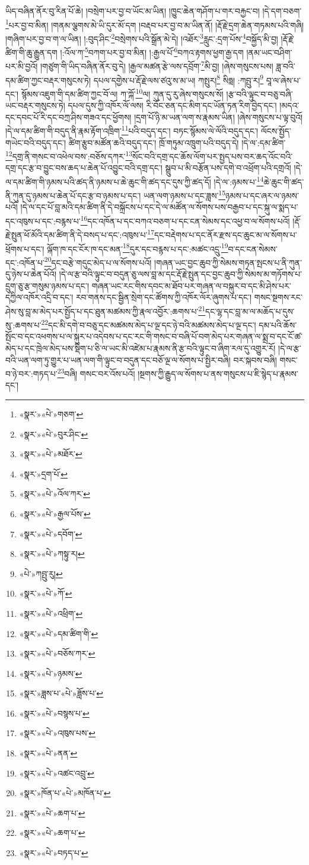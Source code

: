 ཡིད་བཞིན་ནོར་བུ་རིན་པོ་ཆེ། །བསྲེག་པར་བྱ་བ་ཡོང་མ་ཡིན། །ཁྱུང་ཆེན་གཤོག་པ་གར་བརྐྱང་བ། །དེ་དག་བཅག་\footnote{«སྣར་»«པེ་»གཅག་}པར་བྱ་བ་མིན། །གནམ་ལྕགས་མེ་ཡི་དུར་མོ་དག །བརྡབ་པར་བྱ་བ་མ་ཡིན་ནོ། །རྡོ་རྗེ་དྲག་ཆེན་གཏམས་པའི་གཞི། །གཞིག་པར་བྱ་བ་ག་ལ་ཡིན། །:བུད་ཤིང་\footnote{«སྣར་»«པེ་»བུར་ཤིང་}བསྲེགས་པའི་སྒྲོན་མེ་དེ། །འཐོར་\footnote{«སྣར་»«པེ་»མཐོར་}རླུང་:དྲག་པོས་\footnote{«སྣར་»དྲག་པོ་}བསྐྱོད་མི་བྱ། །རྡོ་རྗེ་ཚིག་གི་ཆུ་རྒྱུན་དག །:འོལ་ཀ་\footnote{«སྣར་»«པེ་»འོལ་ཀར་}བཀག་པར་བྱ་བ་མིན། །:རྒྱལ་པོ་\footnote{«སྣར་»«པེ་»རྒྱལ་པོས་}བཀའ་རྟགས་ཕྱག་རྒྱ་དག །ནམ་ཡང་བཤིག་པར་མི་བྱའོ། །གཙུག་གི་ཡིད་བཞིན་ནོར་བུ་དེ། །རྒྱལ་མཚན་རྩེ་ལས་དབྲོག་\footnote{«སྣར་»«པེ་»དབོག་}མི་བྱ། །ཞེས་གསུངས་པས། ཟླ་བའི་དམ་ཚིག་ཀྱང་བརྡར་གསུངས་ཏེ། དཔལ་དགྱེས་པ་རྡོ་རྗེ་ལས་ཙའུ་ས་མ་ཡ། ཀསྤུར།\footnote{«སྣར་»«པེ་»ཀསྟུ་ར།} སིཧླ། :ཀབྤུ་ར།\footnote{«པེ་»ཀབྤུ་རུ།} བཱ་ལ་ཞེས་པ་དང་། སྙོམས་འཇུག་གི་དམ་ཚིག་ཀྱང་བོ་ལ། ཀ་ཀྐོ་\footnote{«སྣར་»«པེ་»ཀོ་}ལ། ཀུན་དུ་རུ་ཞེས་གསུངས་སོ། །རྩ་བའི་ལྟུང་བ་བཅུ་བཞི་ཡང་བརྡར་གསུངས་ཏེ། དཔལ་དུས་ཀྱི་འཁོར་ལོ་ལས། རི་བོང་ཅན་དང་མིག་དང་ཡོན་ཏན་རིག་བྱེད་དང་། །མདའ་དང་དབང་པོ་རི་དང་བཀྲ་ཤིས་གཟའ་དང་ཕྱོགས། །དྲག་པོ་ཉི་མ་ཡན་ལག་ས་རྣམས་ཡིན། །ཞེས་གསུངས་པ་ལྟ་བུའོ། །དེ་ལ་དམ་ཚིག་གི་བདུད་ནི་རྣམ་རྟོག་འཁྲིག་\footnote{«སྣར་»«པེ་»འཕྲིག་}པའི་བདུད་དང་། བཏང་སྙོམས་ལེ་ལོའི་བདུད་དང་། ལོངས་སྤྱོད་གཡེང་བའི་བདུད་དང་། ཚིག་རྩུབ་མཚོན་ཆའི་བདུད་དང་། ཁྲོ་གཏུམ་འཁྲུག་པའི་བདུད་དེ། །དེ་ལ་:དམ་ཚིག་\footnote{«སྣར་»«པེ་»དམ་ཚིག་གི་}དགྲ་ནི་གསང་བ་འཕེལ་བས་:བཅོས་དཀར་\footnote{«སྣར་»«པེ་»བཅོས་ཀར་}སོང་བའི་དགྲ་དང་ཆོས་ལོག་པར་སྤྱད་པས་བར་ཆད་འོང་བའི་དགྲ་དང་རྩ་བ་བྱུང་བས་ཆད་པ་ཆེན་པོ་འབྱུང་བའི་དགྲ་དང་། སྒྲུབ་པ་མི་བརྩོན་པས་དགེ་བ་འཕྲོག་པའི་དགྲའོ། །དེ་ལ་དམ་ཚིག་གི་ཉམས་པའི་ཚད་ནི་ཉམས་པ་ཆེ་ཆུང་གི་ཚད་དང་དུས་ཀྱི་ཚད་དོ། །དེ་ལ་:ཉམས་པ་\footnote{«སྣར་»«པེ་»ཉམས་}ཆེ་ཆུང་གི་ཚད་ནི་ཀུན་དུ་ཉམས་པ་ཆེན་པོ་དང་རྩ་བ་ཉམས་པ་དང་། ཡན་ལག་ཉམས་པ་དང་ཟླས་\footnote{«སྣར་»ཟླས་པ་«པེ་»ཟློས་པ་}ཉམས་པ་དང་ཞར་ལ་ཉམས་པའོ། །དེ་ལ་དང་པོ་བླ་མའི་དམ་ཚིག་ནི་དེ་བསྐྲོངས་པ་དང་དེ་ལ་མཚོན་ལ་སོགས་པས་བརྒྱབ་པ་དང་སྐུ་ལ་སྨད་པ་དང་འཁུས་པ་དང་:བརྙས་པ་\footnote{«སྣར་»«པེ་»བསྙས་པ་}དང་འཁོན་པ་དང་བཀའ་བཅག་པ་དང་ངན་སེམས་དང་འཕྱ་བ་ལ་སོགས་པའོ། །རྡོ་རྗེ་སྤུན་ཕོ་མོའི་དམ་ཚིག་ནི་དེ་བསད་པ་དང་:འཁུས་པ་\footnote{«སྣར་»«པེ་»འཁུས་པས་}དང་བརྡེགས་པ་དང་ནོར་རྫས་དང་ཆུང་མ་ལ་སོགས་པ་ཕྲོགས་པ་དང་། ལྐོག་ཁ་དང་ངོར་ཁ་དང་མན་\footnote{«སྣར་»«པེ་»ནན་}དུར་དང་བརྙས་པ་དང་:མཚང་འདྲུ་\footnote{«སྣར་»«པེ་»འཚང་འབྲུ་}བ་དང་ངན་སེམས་དང་:འཁོན་པ་\footnote{«སྣར་»ཁོན་པ་«པེ་»མཁོན་པ་}དང་བརྩེ་གདུང་མེད་པ་ལ་སོགས་པའོ། །གཞན་ཡང་བྱང་ཆུབ་ཀྱི་སེམས་གཏན་སྤངས་པ་ནི་ཀུན་དུ་ཉེས་པ་ཆེན་པོའོ། །དེ་ལ་རྩ་བའི་ལྟུང་བ་བདུན་ཅུ་ལས་བླ་མ་དང་རྡོ་རྗེ་སྤུན་དང་བྱང་ཆུབ་ཀྱི་སེམས་མ་གཏོགས་པ་དྲུག་ཅུ་རྩ་གསུམ་ཉམས་པ་དང་། གཞན་ཡང་རང་གིས་དབང་མ་ཐོབ་པར་གཞན་ལ་བསྐུར་བ་དང་མི་ཤེས་པར་དཀྱིལ་འཁོར་འདྲི་བ་དང་། རབ་གནས་དང་སྦྱིན་སྲེག་དང་ཚོགས་ཀྱི་འཁོར་ལོར་ཞུགས་པ་དང་། གསང་སྔགས་རང་ཤེས་སུ་བླ་མ་མེད་པར་སྤྱོད་པ་དང་ཐུན་མཚམས་ཀྱི་རྣལ་འབྱོར་:ཆགས་པ་\footnote{«སྣར་»«པེ་»ཆག་པ་}དང་ལྷ་དང་བླ་མ་ལ་མཆོད་པ་དུས་སུ་:ཆགས་པ་\footnote{«སྣར་»«པེ་»ཆག་པ་}དང་མི་དགེ་བ་བཅུ་དང་མཚམས་མེད་པ་ལྔ་དང་ཉེ་བའི་མཚམས་མེད་པ་ལྔ་དང་། དམ་པའི་ཆོས་སྤོང་བ་དང་འཕགས་པ་ལ་སྐུར་པ་འདེབས་པ་དང་རང་གི་གསང་བ་བཞི་པོ་བག་མེད་པར་གཞན་ལ་སྨྲ་བ་དང་ངོ་ཚ་མེད་པ་དང་ཁྲེལ་མེད་པས་སྡིག་པ་ཅི་ལ་ཡང་མི་འཛེམ་པ་རྣམས་ནི་རྩ་བའི་ལྟུང་བ་ཞིག་རལ་དུ་འགྱུར་རོ། །དེ་ལ་རྩ་བའི་ཡན་ལག་ཏུ་གྱུར་པ་ཡན་ལག་གི་ལྟུང་བ་བདུན་དང་བཅོ་ལྔ་ལ་སོགས་པ་སྤྱིར་བཞི། བར་སྐབས་བཞི། གསང་བ་ཉེ་བར་:གཏད་པ་\footnote{«སྣར་»«པེ་»བཏད་པ་}བཞི། གསང་བར་འོས་པའོ། །སྔགས་ཀྱི་རྒྱུད་ལ་སོགས་པ་ནས་གསུངས་པ་ཇི་སྙེད་པ་རྣམས་དང་། 